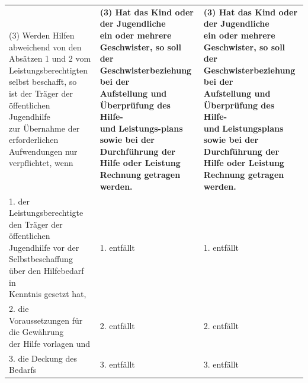 \documentclass[10pt,a4paper,landscape]{article}
\begin{document}
\begin{longtable}{|L{8.2cm}|L{8.2cm}|L{8.2cm}|}
(3) \textcolor{diffred}{Werden Hilfen abweichend von den  \newline Absätzen 1} und \textcolor{diffred}{2 vom  \newline Leistungsberechtigten selbst beschafft, so  \newline ist} der \textcolor{diffred}{Träger} der \textcolor{diffred}{öffentlichen Jugendhilfe  \newline zur Übernahme der erforderlichen  \newline Aufwendungen nur verpflichtet, wenn} & \textbf{(3) Hat das Kind oder der Jugendliche  \newline ein oder mehrere Geschwister, so soll  \newline der Geschwisterbeziehung bei der  \newline Aufstellung und Überprüfung des Hilfe-  \newline und }\textbf{\textcolor{diffred}{Leistungs-plans}}\textbf{ sowie bei der  \newline Durchführung der Hilfe oder Leistung  \newline Rechnung getragen werden. } & \textbf{(3) Hat das Kind oder der Jugendliche  \newline ein oder mehrere Geschwister, so soll  \newline der Geschwisterbeziehung bei der  \newline Aufstellung und Überprüfung des Hilfe-  \newline und }\textbf{\textcolor{diffgreen}{Leistungsplans}}\textbf{ sowie bei der  \newline Durchführung der Hilfe oder Leistung  \newline Rechnung getragen werden. } \\
\hhline{|---|}
1.   \newline \textcolor{diffred}{der Leistungsberechtigte den Träger der  \newline öffentlichen Jugendhilfe vor der  \newline Selbstbeschaffung über den Hilfebedarf in  \newline Kenntnis gesetzt hat,} & 1. entfällt & 1. entfällt \\
\hhline{|---|}
2.   \newline \textcolor{diffred}{die Voraussetzungen für die Gewährung  \newline der Hilfe vorlagen und} & 2. entfällt & 2. entfällt \\
\hhline{|---|}
3.   \newline \textcolor{diffred}{die Deckung des Bedarfs} & 3. entfällt & 3. entfällt \\

\end{longtable}
\end{document}

